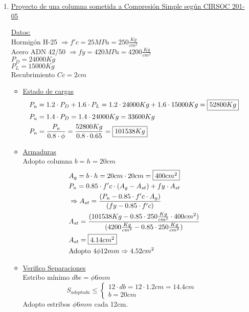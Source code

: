 \begin{enumerate}
\item \underline{Proyecto de una columna sometida a Compresión Simple según CIRSOC 201-05}

\underline{Datos:}\\
Hormigón H-25 $\Rightarrow f'c = 25 MPa = 250 \frac{Kg}{cm^2}$\\
Acero ADN 42/50 $\Rightarrow fy = 420 MPa = 4200 \frac{Kg}{cm^2}$\\
$P_D = 24000Kg$ \\
$P_L = 15000Kg$ \\
Recubrimiento $Cc = 2cm$\\

\begin{itemize}
\item \underline{Estado de cargas}
\begin{align*}
& P_u = 1.2 \cdot P_D + 1.6 \cdot P_L = 1.2 \cdot 24000Kg  + 1.6 \cdot 15000Kg = \framebox{$52800Kg$}\\
& P_u = 1.4 \cdot P_D = 1.4 \cdot 24000Kg = 33600Kg\\
& P_n = \frac{P_u}{0.8 \cdot \phi} = \frac{52800Kg}{0.8 \cdot 0.65} = \framebox{$101538Kg$}
\end{align*}

\item \underline{Armaduras} \\
Adopto columna $b = h = 20cm$
\begin{align*}
& A_g = b \cdot h = 20cm \cdot 20cm = \framebox{$400cm^2$} \\
& P_n = 0.85 \cdot f'c \cdot (A_g - A_{st}) + fy \cdot A_{st} \\
& \Rightarrow A_{st} = \frac{(P_n - 0.85 \cdot f'c \cdot A_g)}{(fy - 0.85 \cdot f'c)} \\
& A_{st} = \frac{(101538Kg - 0.85 \cdot 250 \frac{Kg}{cm^2} \cdot 400cm^2)}{(4200 \frac{Kg}{cm^2} - 0.85 \cdot 250 \frac{Kg}{cm^2})} \\
& A_{st} = \framebox{$4.14cm^2$} \\
& \text{Adopto }4 \phi 12mm \Rightarrow 4.52cm^2
\end{align*}

\item \underline{Verifico Separaciones} \\
Estribo mínimo $dbe = \phi 6mm$\\
\[ S_{adoptada} \leq \left\{ \begin{array}{ll}
         12 \cdot db = 12 \cdot 1.2cm = 14.4cm & \\
         b = 20cm & \end{array} \right. \]
Adopto estribos $\phi 6mm$ cada 12cm.
\end{itemize}


\end{enumerate}
